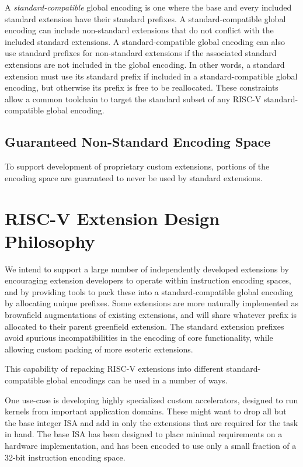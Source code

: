 A {\em standard-compatible} global encoding is one where the base and
every included standard extension have their standard prefixes.  A
standard-compatible global encoding can include non-standard
extensions that do not conflict with the included standard extensions.
A standard-compatible global encoding can also use standard prefixes
for non-standard extensions if the associated standard extensions are
not included in the global encoding.  In other words, a standard
extension must use its standard prefix if included in a
standard-compatible global encoding, but otherwise its prefix is free
to be reallocated.  These constraints allow a common toolchain to
target the standard subset of any RISC-V standard-compatible global
encoding.

\vspace{-0.2in}
\subsection*{Guaranteed Non-Standard Encoding Space}

To support development of proprietary custom extensions, portions of
the encoding space are guaranteed to never be used by standard
extensions.

\section{RISC-V Extension Design Philosophy}

We intend to support a large number of independently developed
extensions by encouraging extension developers to operate within
instruction encoding spaces, and by providing tools to pack these into
a standard-compatible global encoding by allocating unique prefixes.
Some extensions are more naturally implemented as brownfield
augmentations of existing extensions, and will share whatever prefix
is allocated to their parent greenfield extension.  The standard
extension prefixes avoid spurious incompatibilities in the encoding of
core functionality, while allowing custom packing of more esoteric
extensions.

This capability of repacking RISC-V extensions into different
standard-compatible global encodings can be used in a number of ways.

One use-case is developing highly specialized custom accelerators,
designed to run kernels from important application domains.  These
might want to drop all but the base integer ISA and add in only the
extensions that are required for the task in hand.  The base ISA has
been designed to place minimal requirements on a hardware
implementation, and has been encoded to use only a small fraction of a
32-bit instruction encoding space.

